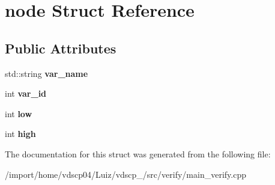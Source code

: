 \section{node Struct Reference}
\label{structnode}
\subsection*{Public Attributes}
\begin{DoxyCompactItemize}
\item 
std\+::string {\bfseries var\+\_\+name}\label{structnode_a6a26f5e7101293a34704c34ab2b8846f}

\item 
int {\bfseries var\+\_\+id}\label{structnode_a9349fd79d66c48b710644e0833b8d316}

\item 
int {\bfseries low}\label{structnode_a10be3a6d1a2699623bebe2e3b49eff08}

\item 
int {\bfseries high}\label{structnode_a87e109220475573c3aedddb10b68dc45}

\end{DoxyCompactItemize}


The documentation for this struct was generated from the following file\+:\begin{DoxyCompactItemize}
\item 
/import/home/vdscp04/\+Luiz/vdscp\+\_/src/verify/main\+\_\+verify.\+cpp\end{DoxyCompactItemize}
